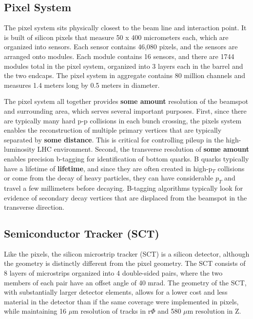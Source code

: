 \subsection{Pixel System}
The pixel system sits physically closest to the beam line and interaction point.  It is built of silicon pixels that measure 50 x 400 micrometers each, which are organized into sensors.  Each sensor contains 46,080 pixels, and the sensors are arranged onto modules.  Each module contains 16 sensors, and there are 1744 modules total in the pixel system, organized into 3 layers each in the barrel and the two endcaps.  The pixel system in aggregate contains 80 million channels and measures 1.4 meters long by 0.5 meters in diameter.

The pixel system all together provides \textbf{some amount} resolution of the beamspot and surrounding area, which serves several important purposes.  First, since there are typically many hard p-p collisions in each bunch crossing, the pixels system enables the reconstruction of multiple primary vertices that are typically separated by \textbf{some distance}.  This is critical for controlling pileup in the high-luminosity LHC environment.  Second, the transverse resolution of \textbf{some amount} enables precision b-tagging for identification of bottom quarks.  B quarks typically have a lifetime of \textbf{lifetime}, and since they are often created in high-p$_T$ collisions or come from the decay of heavy particles, they can have considerable $p_T$ and travel a few millimeters before decaying.  B-tagging algorithms typically look for evidence of secondary decay vertices that are displaced from the beamspot in the transverse direction.   

\subsection{Semiconductor Tracker (SCT)}
Like the pixels, the silicon microstrip tracker (SCT) is a silicon detector, although the geometry is distinctly different from the pixel geometry.  The SCT consists of 8 layers of microstrips organized into 4 double-sided pairs, where the two members of each pair have an offset angle of 40 mrad.  The geometry of the SCT, with substantially larger detector elements, allows for a lower cost and less material in the detector than if the same coverage were implemented in pixels, while maintaining 16 $\mu$m resolution of tracks in r$\Phi$ and 580 $\mu$m resolution in Z.   

